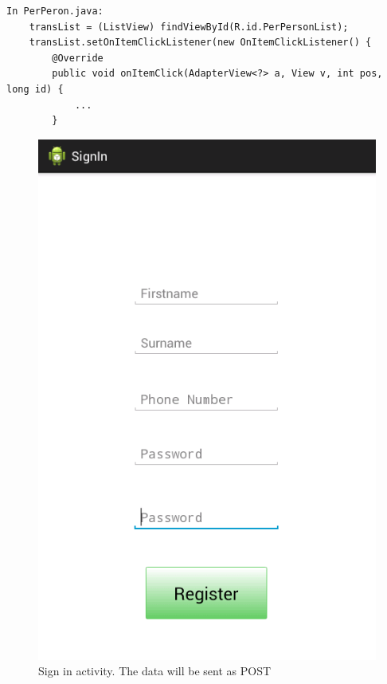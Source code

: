 \documentclass[a4paper,11pt]{article}
\begin{document}
\begin{center}
\begin{verbatim}
In PerPeron.java:
	transList = (ListView) findViewById(R.id.PerPersonList);
	transList.setOnItemClickListener(new OnItemClickListener() {
		@Override
		public void onItemClick(AdapterView<?> a, View v, int pos, long id) {
			...
		}
\end{verbatim}
\end{center}

\begin{figure}[ht]
\begin{center}
\advance\leftskip-3cm
\advance\rightskip-3cm
\includegraphics[keepaspectratio=true,scale=0.5]{signIn}
\caption{Sign in activity. The data will be sent as POST}
\label{visina8}
\end{center}
\end{figure}
\end{document}
